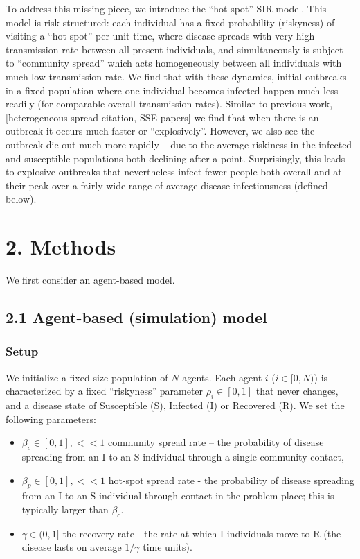 To address this missing piece, we introduce the ``hot-spot'' SIR model.
This model is risk-structured: each individual has a fixed probability
(riskyness) of visiting a ``hot spot'' per unit time, where disease
spreads with very high transmission rate between all present
individuals, and simultaneously is subject to ``community spread'' which
acts homogeneously between all individuals with much low transmission
rate. We find that with these dynamics, initial outbreaks in a fixed
population where one individual becomes infected happen much less
readily (for comparable overall transmission rates). Similar to previous
work, {[}heterogeneous spread citation, SSE papers{]} we find that when
there is an outbreak it occurs much faster or ``explosively''. However,
we also see the outbreak die out much more rapidly -- due to the average
riskiness in the infected and susceptible populations both declining
after a point. Surprisingly, this leads to explosive outbreaks that
nevertheless infect fewer people both overall and at their peak over a
fairly wide range of average disease infectiousness (defined below).

\section{2. Methods}\label{methods}

We first consider an agent-based model.

\subsection{2.1 Agent-based (simulation)
model}\label{agent-based-simulation-model}

\subsubsection{Setup}\label{setup}

We initialize a fixed-size population of \(N\) agents. Each agent \(i\)
(\(i \in [0, N)\)) is characterized by a fixed ``riskyness'' parameter
\(\rho_i \in [0, 1]\) that never changes, and a disease state of
Susceptible (S), Infected (I) or Recovered (R). We set the following
parameters:

\begin{itemize}
\tightlist
\item
  \(\beta_c \in [0, 1], << 1\) community spread rate -- the probability
  of disease spreading from an I to an S individual through a single
  community contact,
\item
  \(\beta_p \in [0, 1], << 1\) hot-spot spread rate - the probability of
  disease spreading from an I to an S individual through contact in the
  problem-place; this is typically larger than \(\beta_c\).
\item
  \(\gamma \in (0, 1]\) the recovery rate - the rate at which I
  individuals move to R (the disease lasts on average \(1/\gamma\) time
  units).
\end{itemize}

